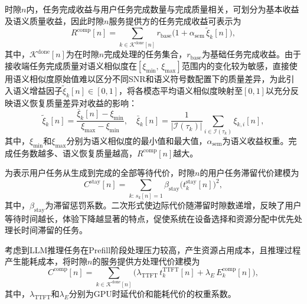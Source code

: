 时隙$n$内，任务完成收益与用户任务完成数量与完成质量相关，可划分为基本收益及语义质量收益，因此时隙$n$服务提供方的任务完成收益可表示为
\begin{equation}\label{eq:R_comp}
R^{\text{comp}}[n] = \sum_{k \in \mathcal{K}^{\text{done}}[n]} r_{\text{base}} \big(1 + \alpha_{\text{sem}}\, \tilde{\xi}_k[n]\big),
\end{equation}
其中，$\mathcal{K}^{\text{done}}[n]$为在时隙$n$完成处理的任务集合，$r_{\text{base}}$为基础任务完成收益。由于接收端任务完成质量对语义相似度在$[\xi_{\min},\,\xi_{\max}]$范围内的变化较为敏感，直接使用语义相似度原始值难以区分不同SNR和语义符号数配置下的质量差异，为此引入语义增益因子$\tilde{\xi}_k[n]\in[0,1]$，将各模态平均语义相似度映射至$[0,1]$以充分反映语义恢复质量差异对收益的影响：
\begin{equation}\label{eq:xi_tilde}
\tilde{\xi}_k[n] = \frac{\bar{\xi}_k[n] - \xi_{\min}}{\xi_{\max} - \xi_{\min}},\quad
\bar{\xi}_k[n] = \frac{1}{|\mathcal{I}(\tau_k)|}\sum_{i\in\mathcal{I}(\tau_k)}\xi_{k,i}[n],
\end{equation}
其中，$\xi_{\min}$和$\xi_{\max}$分别为语义相似度的最小值和最大值，$\alpha_{\text{sem}}$为语义收益权重。完成任务数越多、语义恢复质量越高，$R^{\text{comp}}[n]$越大。

为表示用户任务从生成到完成的全部等待代价，时隙$n$的用户任务滞留代价建模为
\begin{equation}\label{eq:C_stay}
C^{\text{stay}}[n] = \sum_{k:\, s_k[n]=1} \beta_{\text{stay}} \big(t_k^{\text{stay}}[n]\big)^2,
\end{equation}
其中，$\beta_{\text{stay}}$为滞留惩罚系数。二次形式使边际代价随滞留时隙数递增，反映了用户等待时间越长，体验下降越显著的特点，促使系统在设备选择和资源分配中优先处理长时间滞留的任务。

考虑到LLM推理任务在Prefill阶段处理压力较高，产生资源占用成本，且推理过程产生能耗成本，将时隙$n$的服务提供方处理代价建模为
\begin{equation}\label{eq:C_comp}
C^{\text{comp}}[n] = \sum_{k \in \mathcal{K}^{\text{done}}[n]} \big(\lambda_{\text{TTFT}}\, t_k^{\text{TTFT}}[n] + \lambda_E\, E_k^{\text{comp}}[n]\big),
\end{equation}
其中，$\lambda_{\text{TTFT}}$和$\lambda_E$分别为GPU时延代价和能耗代价的权重系数。
